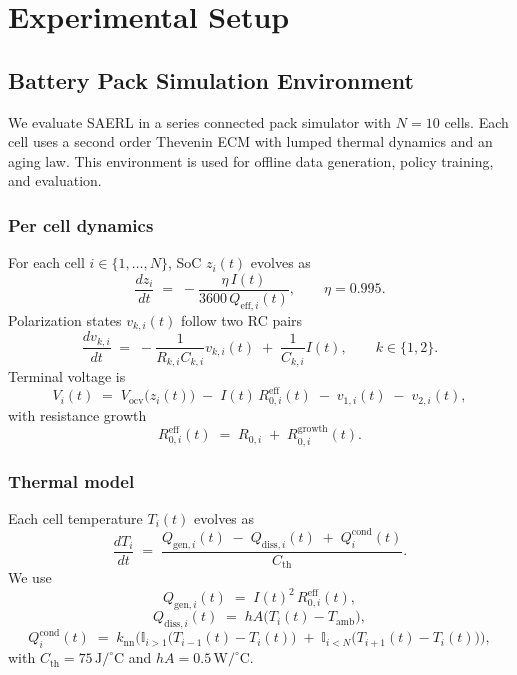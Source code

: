 \documentclass[%
 aip,
 amsmath,amssymb,
reprint, onecolumn %
]{revtex4-1}
\begin{document}
\section{Experimental Setup}
\label{sec:experimental_setup}

\subsection{Battery Pack Simulation Environment}
\label{subsec:sim_env}
We evaluate SAERL in a series connected pack simulator with $N=10$ cells. Each cell uses a second order Thevenin ECM with lumped thermal dynamics and an aging law. This environment is used for offline data generation, policy training, and evaluation.

\subsubsection{Per cell dynamics}
\label{subsubsec:cell_dynamics}
For each cell $i \in \{1,\dots,N\}$, SoC $z_i(t)$ evolves as
\begin{equation}
\frac{d z_i}{d t} \;=\; -\frac{\eta\, I(t)}{3600\, Q_{\mathrm{eff},i}(t)},
\qquad \eta = 0.995 .
\end{equation}
Polarization states $v_{k,i}(t)$ follow two RC pairs
\begin{equation}
\frac{d v_{k,i}}{d t} \;=\; -\frac{1}{R_{k,i} C_{k,i}} v_{k,i}(t) \;+\; \frac{1}{C_{k,i}} I(t),
\qquad k \in \{1,2\}.
\end{equation}
Terminal voltage is
\begin{equation}
V_i(t) \;=\; V_{\mathrm{ocv}}\!\big(z_i(t)\big) \;-\; I(t)\, R^{\mathrm{eff}}_{0,i}(t) \;-\; v_{1,i}(t) \;-\; v_{2,i}(t),
\end{equation}
with resistance growth
\begin{equation}
R^{\mathrm{eff}}_{0,i}(t) \;=\; R_{0,i} \;+\; R^{\mathrm{growth}}_{0,i}(t).
\end{equation}

\subsubsection{Thermal model}
\label{subsubsec:thermal_model}
Each cell temperature $T_i(t)$ evolves as
\begin{equation}
\frac{d T_i}{d t} \;=\; \frac{Q_{\mathrm{gen},i}(t) \;-\; Q_{\mathrm{diss},i}(t) \;+\; Q^{\mathrm{cond}}_{i}(t)}{C_{\mathrm{th}}}.
\end{equation}
We use
\begin{equation}
Q_{\mathrm{gen},i}(t) \;=\; I(t)^2\, R^{\mathrm{eff}}_{0,i}(t),
\end{equation}
\begin{equation}
Q_{\mathrm{diss},i}(t) \;=\; hA \big(T_i(t) - T_{\mathrm{amb}}\big),
\end{equation}
\begin{equation}
Q^{\mathrm{cond}}_{i}(t) \;=\; k_{\mathrm{nn}} \Big( \mathbb{I}_{i>1}\big(T_{i-1}(t)-T_i(t)\big) \;+\; \mathbb{I}_{i<N}\big(T_{i+1}(t)-T_i(t)\big) \Big),
\end{equation}
with $C_{\mathrm{th}} = 75\,\mathrm{J}/^\circ\mathrm{C}$ and $hA = 0.5\,\mathrm{W}/^\circ\mathrm{C}$.
\end{document}
